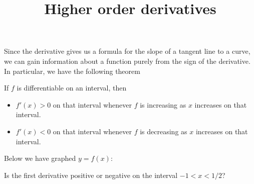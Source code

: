 \documentclass{ximera}
\title[Dig-In:]{Higher order derivatives}
\begin{document}
\begin{abstract}
  
\end{abstract}
\maketitle


Since the derivative gives us a formula for the slope of a tangent
line to a curve, we can gain information about a function purely from
the sign of the derivative.  In particular, we have the following theorem
\begin{theorem}
  If $f$ is differentiable on an interval, then
\begin{itemize}
\item $f'(x)>0$ on that interval whenever $f$ is increasing as $x$
  increases on that interval.
\item $f'(x)<0$ on that interval whenever $f$ is decreasing as $x$
  increases on that interval.
\end{itemize}
\end{theorem}
\begin{question}
  Below we have graphed $y=f(x)$:
  \begin{image}
  \end{image}
  Is the first derivative positive or negative on the interval $-1<x<1/2$?
  \begin{prompt}
    \begin{multipleChoice}
    \end{multipleChoice}
  \end{prompt}
\end{question}
\end{document}
